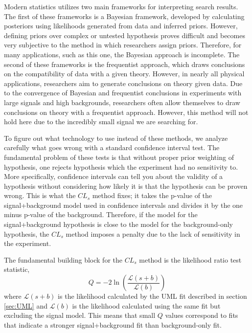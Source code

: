Modern statistics utilizes two main frameworks for interpreting search results. The first of these frameworks is a Bayesian framework, developed by calculating posteriors using likelihoods generated from data and inferred priors. However, defining priors over complex or untested hypothesis proves difficult and becomes very subjective to the method in which researchers assign priors. Therefore, for many applications, such as this one, the Bayesian approach is incomplete. The second of these frameworks is the frequentist approach, which draws conclusions on the compatibility of data with a given theory. However, in nearly all physical applications, researchers aim to generate conclusions on theory given data. Due to the convergence of Bayesian and frequentist conclusions in experiments with large signals and high backgrounds, researchers often allow themselves to draw conclusions on theory with a frequentist approach. However, this method will not hold here due to the incredibly small signal we are searching for.

To figure out what technology to use instead of these methods, we analyze carefully what goes wrong with a standard confidence interval test. The fundamental problem of these tests is that without proper prior weighting of hypothesis, one rejects hypothesis which the experiment had no sensitivity to. More specifically, confidence intervals can tell you about the validity of a hypothesis without considering how likely it is that the hypothesis can be proven wrong. This is what the $CL_s$ method fixes; it takes the p-value of the signal+background model used in confidence intervals and divides it by the one minus p-value of the background. Therefore, if the model for the signal+background hypothesis is close to the model for the background-only hypothesis, the $CL_s$ method imposes a penalty due to the lack of sensitivity in the experiment. 

The fundamental building block for the $CL_s$ method is the likelihood ratio test statistic, 
\begin{equation}
    Q = -2 \ln \left(\frac{\mathcal{L}(s+b)}{\mathcal{L}(b)}\right)
\end{equation}
where $\mathcal{L}(s+b)$ is the likelihood calculated by the UML fit described in section \ref{sec:UML} and $\mathcal{L}(b)$ is the likelihood calculated using the same fit but excluding the signal model. This means that small $Q$ values correspond to fits that indicate a stronger signal+background fit than background-only fit. 

